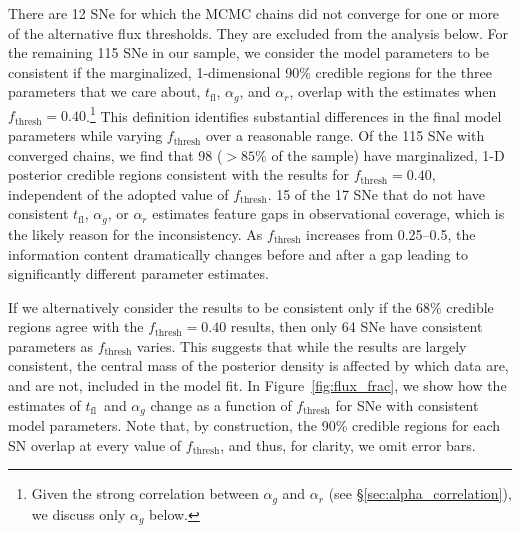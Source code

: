 \documentclass[twocolumn]{aastex63}
\newcommand{\tfl}{$t_\mathrm{fl}$}
\begin{document}
There are 12 SNe for which the MCMC chains did not converge for one or more of
the alternative flux thresholds. They are excluded from the analysis below.
For the remaining 115 SNe in our sample, we consider the model parameters to
be consistent if the marginalized, 1-dimensional 90\% credible regions for the
three parameters that we care about, \tfl, $\alpha_g$, and $\alpha_r$, overlap
with the estimates when $f_\mathrm{thresh} = 0.40$.\footnote{Given the strong
correlation between $\alpha_g$ and $\alpha_r$ (see
\S\ref{sec:alpha_correlation}), we discuss only $\alpha_g$ below.} This
definition identifies substantial differences in the final model parameters
while varying $f_\mathrm{thresh}$ over a reasonable range. Of the 115 SNe with
converged chains, we find that 98 ($> 85\%$ of the sample) have marginalized,
1-D posterior credible regions consistent with the results for
$f_\mathrm{thresh} = 0.40$, independent of the adopted value of
$f_\mathrm{thresh}$. 15 of the 17 SNe that do not have consistent \tfl,
$\alpha_g$, or $\alpha_r$ estimates feature gaps in observational coverage,
which is the likely reason for the inconsistency. As $f_\mathrm{thresh}$
increases from 0.25--0.5, the information content dramatically changes before
and after a gap leading to significantly different parameter estimates.

If we alternatively consider the results to be consistent only if the 68\%
credible regions agree with the $f_\mathrm{thresh} = 0.40$ results, then only
64 SNe have consistent parameters as $f_\mathrm{thresh}$ varies. This suggests
that while the results are largely consistent, the central mass of the
posterior density is affected by which data are, and are not, included in the
model fit. In Figure~\ref{fig:flux_frac}, we show how the estimates of \tfl\
and $\alpha_g$ change as a function of $f_\mathrm{thresh}$ for SNe with
consistent model parameters. Note that, by construction, the 90\% credible
regions for each SN overlap at every value of $f_\mathrm{thresh}$, and thus,
for clarity, we omit error bars.
\end{document}
